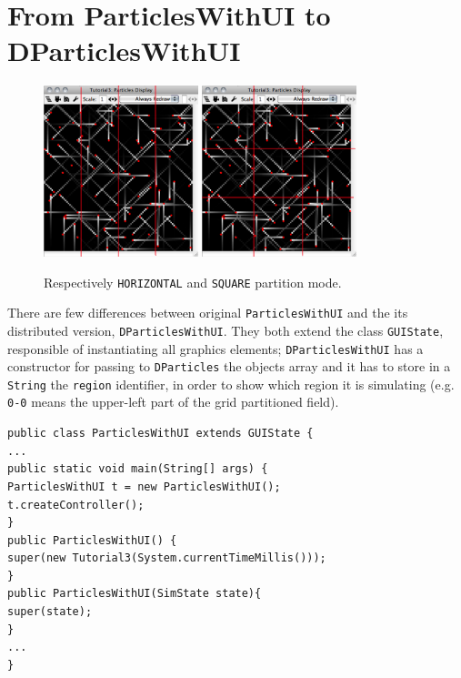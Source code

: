 \documentclass{book}
\begin{document}
\section{From ParticlesWithUI to DParticlesWithUI}
\begin{figure}
\centering
\includegraphics[width=0.4\textwidth,bb=0 0 470 520]{particles-h.png} 
\includegraphics[width=0.4\textwidth,bb=0 0 470 520]{particles-m.png}
\caption{Respectively \texttt{HORIZONTAL} and \texttt{SQUARE} partition mode.}
\label{fig:dp01}
\end{figure}
There are few differences between original \texttt{ParticlesWithUI} and the its distributed version, \texttt{DParticlesWithUI}. They both extend the class \texttt{GUIState}, responsible of instantiating all graphics elements; \texttt{DParticlesWithUI} has a constructor for passing to \texttt{DParticles} the objects array and it has to store in a \texttt{String} the \texttt{region} identifier, in order to show which region it is simulating (e.g. \texttt{0-0} means the upper-left part of the grid partitioned field).
\begin{lstlisting}
public class ParticlesWithUI extends GUIState {
...
public static void main(String[] args) {
ParticlesWithUI t = new ParticlesWithUI();
t.createController();
}
public ParticlesWithUI() { 
super(new Tutorial3(System.currentTimeMillis()));
}
public ParticlesWithUI(SimState state){
super(state);
}
...
}
\end{lstlisting}
\end{document}
